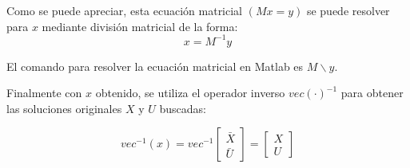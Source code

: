 Como se puede apreciar, esta ecuación matricial $(M x = y)$ se puede resolver para $x$ mediante división matricial de la forma:
\begin{equation}
    x = M^{-1} y
\end{equation}
\begin{remark}
    El comando para resolver la ecuación matricial en Matlab es $M \backslash y$.
\end{remark}

Finalmente con $x$ obtenido, se utiliza el operador inverso $vec(\cdot)^{-1}$ para obtener las soluciones originales $X$ y $U$ buscadas:

\begin{equation}
    vec^{-1}(x) = vec^{-1}\begin{bmatrix} \bar{X} \\ \bar{U} \end{bmatrix} = \begin{bmatrix}
        X \\ U
    \end{bmatrix}
\end{equation}





